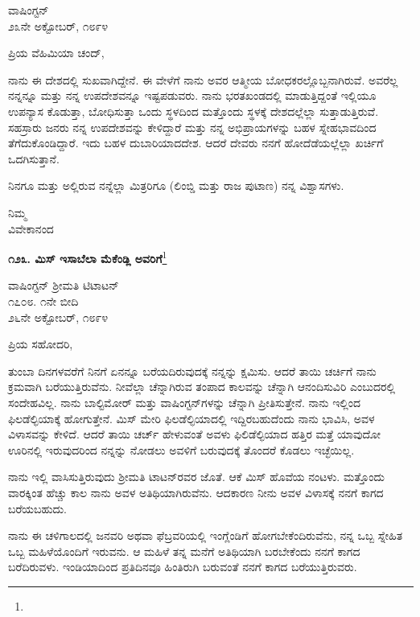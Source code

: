 \begin{flushright}
ವಾಷಿಂಗ್ಟನ್\\೨೩ನೇ ಅಕ್ಟೋಬರ್, ೧೮೯೪
\end{flushright}

\noindent
ಪ್ರಿಯ ವೆಹಿಮಿಯಾ ಚಂದ್,

ನಾನು ಈ ದೇಶದಲ್ಲಿ ಸುಖವಾಗಿದ್ದೇನೆ. ಈ ವೇಳೆಗೆ ನಾನು ಅವರ ಆತ್ಮೀಯ ಬೋಧಕರಲ್ಲೊಬ್ಬನಾಗಿರುವೆ. ಅವರೆಲ್ಲ ನನ್ನನ್ನೂ ಮತ್ತು ನನ್ನ ಉಪದೇಶವನ್ನೂ ಇಷ್ಟಪಡುವರು. ನಾನು ಭರತಖಂಡದಲ್ಲಿ ಮಾಡುತ್ತಿದ್ದಂತೆ ಇಲ್ಲಿಯೂ ಉಪನ್ಯಾಸ ಕೊಡುತ್ತಾ, ಬೋಧಿಸುತ್ತಾ ಒಂದು ಸ್ಥಳದಿಂದ ಮತ್ತೊಂದು ಸ್ಥಳಕ್ಕೆ ದೇಶದಲ್ಲೆಲ್ಲಾ ಸುತ್ತಾಡುತ್ತಿರುವೆ. ಸಹಸ್ರಾರು ಜನರು ನನ್ನ ಉಪದೇಶವನ್ನು ಕೇಳಿದ್ದಾರೆ ಮತ್ತು ನನ್ನ ಅಭಿಪ್ರಾಯಗಳನ್ನು ಬಹಳ ಸ್ನೇಹಭಾವದಿಂದ ತೆಗೆದುಕೊಂಡಿದ್ದಾರೆ. ಇದು ಬಹಳ ದುಬಾರಿಯಾದದೇಶ. ಆದರೆ ದೇವರು ನನಗೆ ಹೋದೆಡೆಯಲ್ಲೆಲ್ಲಾ ಖರ್ಚಿಗೆ ಒದಗಿಸುತ್ತಾನೆ.

ನಿನಗೂ ಮತ್ತು ಅಲ್ಲಿರುವ ನನ್ನೆಲ್ಲಾ ಮಿತ್ರರಿಗೂ (ಲಿಂಬ್ಡಿ ಮತ್ತು ರಾಜ ಪುಟಾಣ) ನನ್ನ ವಿಶ್ವಾಸಗಳು.

{\flushright
ನಿಮ್ಮ\\ವಿವೇಕಾನಂದ\par}

\begin{center}
\textbf{೧೨೩. ಮಿಸ್ ಇಸಾಬೆಲಾ ಮೆಕೆಂಡ್ಲಿ ಅವರಿಗೆ}\footnote{}
\end{center}

\begin{flushright}
ವಾಷಿಂಗ್ಟನ್  ಶ‍್ರೀಮತಿ ಟಿಟಾಟನ್\\೧೭೦೮. ೧ನೇ ಬೀದಿ\\೨೬ನೇ ಅಕ್ಟೋಬರ್, ೧೮೯೪
\end{flushright}

\noindent
ಪ್ರಿಯ ಸಹೋದರಿ,

ತುಂಬಾ ದಿನಗಳವರೆಗೆ ನಿನಗೆ ಏನನ್ನೂ ಬರೆಯದಿರುವುದಕ್ಕೆ ನನ್ನನ್ನು ಕ್ಷಮಿಸು. ಆದರೆ ತಾಯಿ ಚರ್ಚಿಗೆ ನಾನು ಕ್ರಮವಾಗಿ ಬರೆಯುತ್ತಿರುವೆನು. ನೀವೆಲ್ಲಾ ಚೆನ್ನಾಗಿರುವ ತಂಪಾದ ಕಾಲವನ್ನು ಚೆನ್ನಾಗಿ ಆನಂದಿಸುವಿರಿ ಎಂಬುದರಲ್ಲಿ ಸಂದೇಹವಿಲ್ಲ. ನಾನು ಬಾಲ್ಟಿಮೋರ್‌ ಮತ್ತು ವಾಷಿಂಗ್ಟನ್‌ಗಳನ್ನು ಚೆನ್ನಾಗಿ ಪ್ರೀತಿಸುತ್ತೇನೆ. ನಾನು ಇಲ್ಲಿಂದ ಫಿಲಡೆಲ್ಫಿಯಾಕ್ಕೆ ಹೋಗುತ್ತೇನೆ. ಮಿಸ್ ಮೇರಿ ಫಿಲಡೆಲ್ಫಿಯಾದಲ್ಲಿ ಇದ್ದಿರಬಹುದೆಂದು ನಾನು ಭಾವಿಸಿ, ಅವಳ ವಿಳಾಸವನ್ನು ಕೇಳಿದೆ. ಆದರೆ ತಾಯಿ ಚರ್ಚ್ ಹೇಳುವಂತೆ ಅವಳು ಫಿಲಿಡೆಲ್ಫಿಯಾದ ಹತ್ತಿರ ಮತ್ತೆ ಯಾವುದೋ ಊರಿನಲ್ಲಿ ಇರುವುದರಿಂದ ನನ್ನನ್ನು ನೋಡಲು ಅವಳಿಗೆ ಬರುವುದಕ್ಕೆ ತೊಂದರೆ ಕೊಡಲು ಇಚ್ಛೆಯಿಲ್ಲ.

ನಾನು ಇಲ್ಲಿ ವಾಸಿಸುತ್ತಿರುವುದು ಶ‍್ರೀಮತಿ ಟಾಟನ್‌ರವರ ಜೊತೆ. ಆಕೆ ಮಿಸ್ ಹೊವೆಯ ನಂಟಳು. ಮತ್ತೊಂದು ವಾರಕ್ಕಿಂತ ಹೆಚ್ಚು ಕಾಲ ನಾನು ಅವಳ ಅತಿಥಿಯಾಗಿರುವೆನು. ಆದಕಾರಣ ನೀನು ಅವಳ ವಿಳಾಸಕ್ಕೆ ನನಗೆ ಕಾಗದ ಬರೆಯಬಹುದು.

ನಾನು ಈ ಚಳಿಗಾಲದಲ್ಲಿ ಜನವರಿ ಅಥವಾ ಫೆಬ್ರವರಿಯಲ್ಲಿ ಇಂಗ್ಲೆಂಡಿಗೆ ಹೋಗಬೇಕೆಂದಿರುವೆನು, ನನ್ನ ಒಬ್ಬ ಸ್ನೇಹಿತ ಒಬ್ಬ ಮಹಿಳೆಯೊಂದಿಗೆ ಇರುವನು. ಆ ಮಹಿಳೆ ತನ್ನ ಮನೆಗೆ ಅತಿಥಿಯಾಗಿ ಬರಬೇಕೆಂದು ನನಗೆ ಕಾಗದ ಬರೆದಿರುವಳು. ಇಂಡಿಯಾದಿಂದ ಪ್ರತಿದಿನವೂ ಹಿಂತಿರುಗಿ ಬರುವಂತೆ ನನಗೆ ಕಾಗದ ಬರೆಯುತ್ತಿರುವರು.

